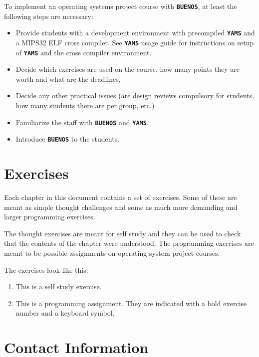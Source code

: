 \documentclass[twoside,a4paper]{report}
\newcommand{\buenos}{\texttt{\textbf{BUENOS}}}
\newcommand{\yams}{\texttt{\textbf{YAMS}}}
\newenvironment{exercises}[1][\addcontentsline{toc}{section}{Exercises}%
\section*{Exercises}\markright{EXERCISES}]{%
#1%
\begin{enumerate}%
}{%
\end{enumerate}
}
\newcounter{exercisec}[chapter]
\newcommand{\exercise}[1]{%
\item[\stepcounter{exercisec}\arabic{chapter}.\theexercisec{}.] #1%
}
\newcommand{\cexercise}[1]{%
\item[\stepcounter{exercisec}{\huge\Keyboard}\hspace{5mm}\textbf{\arabic{chapter}.\theexercisec{}.}] #1%
}
\begin{document}
To implement an operating systems project course with \buenos{}, at least
the following steps are necessary:

\begin{itemize}

\item Provide students with a development environment with precompiled
\yams{} and a MIPS32 ELF cross compiler. See \yams{} usage guide for
instructions on setup of \yams{} and the cross compiler environment.

\item Decide which exercises are used on the course, how many points
they are worth and what are the deadlines.

\item Decide any other practical issues (are design reviews compulsory
for students, how many students there are per group, etc.)

\item Familiarize the staff with \buenos{} and \yams{}.

\item Introduce \buenos{} to the students.

\end{itemize}

\section{Exercises}
\label{sec:exercises}

Each chapter in this document contains a set of exercises. Some of
these are meant as simple thought challenges and some as much more
demanding and larger programming exercises.

The thought exercises are meant for self study and they can be used to
check that the contents of the chapter were understood. The
programming exercises are meant to be possible assignments on
operating system project courses.

The exercises look like this:

\begin{exercises}[\vspace{\baselineskip}]

\exercise{This is a self study exercise.}

\cexercise{This is a programming assignment. They are indicated with a
bold exercise number and a keyboard symbol.}

\end{exercises}

\section{Contact Information}
\end{document}
